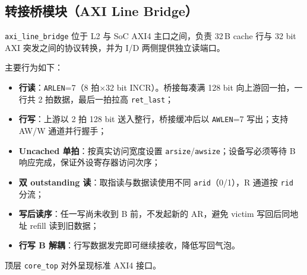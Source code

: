 \subsection{转接桥模块（AXI Line Bridge）}

\texttt{axi\_line\_bridge} 位于 L2 与 SoC AXI4 主口之间，负责 32\,B cache 行与 32 bit AXI 突发之间的协议转换，并为 I/D 两侧提供独立读端口。

主要行为如下：

\begin{itemize}
  \item \textbf{行读}：\texttt{ARLEN}=7（8 拍$\times$32 bit INCR）。桥接每凑满 128 bit 向上游回一拍，一行共 2 拍数据，最后一拍拉高 \texttt{ret\_last}；
  \item \textbf{行写}：上游以 2 拍 128 bit 送入整行，桥接缓冲后以 \texttt{AWLEN}=7 写出；支持 AW/W 通道并行握手；
  \item \textbf{Uncached 单拍}：按真实访问宽度设置 \texttt{arsize}/\texttt{awsize}；设备写必须等待 B 响应完成，保证外设寄存器访问次序；
  \item \textbf{双 outstanding 读}：取指读与数据读使用不同 \texttt{arid}（0/1），R 通道按 \texttt{rid} 分流；
  \item \textbf{写后读序}：任一写尚未收到 B 前，不发起新的 AR，避免 victim 写回后同地址 refill 读到旧数据；
  \item \textbf{行写 B 解耦}：行写数据发完即可继续接收，降低写回气泡。
\end{itemize}

顶层 \texttt{core\_top} 对外呈现标准 AXI4 接口。
